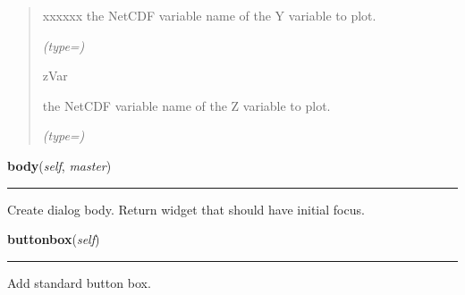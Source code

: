 \begin{boxedminipage}{\funcwidth}
\begin{quote}
\begin{Ventry}{xxxxxx}
          the NetCDF variable name of the Y variable to plot.

            {\it (type=)}

          \item[zVar]

          the NetCDF variable name of the Z variable to plot.

            {\it (type=)}

        \end{Ventry}

      \end{quote}

    \end{boxedminipage}

    \label{nMOLDYN:GUI:PlotNetCDFVariableDialog:PlotNetCDFVariableDialog:body}

    \vspace{0.5ex}

\hspace{.8\funcindent}\begin{boxedminipage}{\funcwidth}

    \raggedright \textbf{body}(\textit{self}, \textit{master})

    \vspace{-1.5ex}

    \rule{\textwidth}{0.5\fboxrule}
\setlength{\parskip}{2ex}
    Create dialog body. Return widget that should have initial focus.

\setlength{\parskip}{1ex}
    \end{boxedminipage}

    \label{nMOLDYN:GUI:PlotNetCDFVariableDialog:PlotNetCDFVariableDialog:buttonbox}

    \vspace{0.5ex}

\hspace{.8\funcindent}\begin{boxedminipage}{\funcwidth}

    \raggedright \textbf{buttonbox}(\textit{self})

    \vspace{-1.5ex}

    \rule{\textwidth}{0.5\fboxrule}
\setlength{\parskip}{2ex}
    Add standard button box.

\setlength{\parskip}{1ex}
    \end{boxedminipage}

